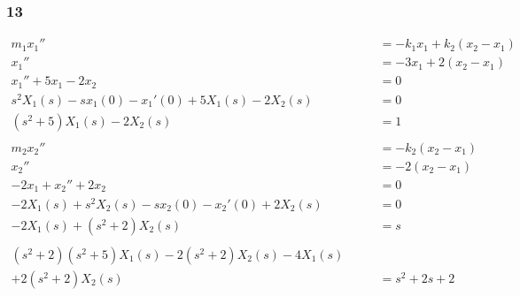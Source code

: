 \documentclass{article}
\begin{document}
\subsubsection{13}

\begin{align*}
  m_1 x_1''                                                         & = -k_1 x_1 + k_2 (x_2 - x_1)                                                          \\
  x_1''                                                             & = -3 x_1 + 2 (x_2 - x_1)                                                              \\
  x_1'' + 5 x_1 - 2 x_2                                             & = 0                                                                                   \\
  s^2 X_1(s) - s x_1(0) - x_1'(0) + 5 X_1(s) - 2 X_2(s)             & = 0                                                                                   \\
  (s^2 + 5) X_1(s) - 2 X_2(s)                                       & = 1                                                                                   \\ \\
  m_2 x_2''                                                         & = -k_2 (x_2 - x_1)                                                                    \\
  x_2''                                                             & = -2 (x_2 - x_1)                                                                      \\
  -2 x_1 + x_2'' + 2 x_2                                            & = 0                                                                                   \\
  -2 X_1(s) + s^2 X_2(s) - s x_2(0) - x_2'(0) + 2 X_2(s)            & = 0                                                                                   \\
  -2 X_1(s) + (s^2 + 2) X_2(s)                                      & = s                                                                                   \\ \\
  (s^2 + 2) (s^2 + 5) X_1(s) - 2 (s^2 + 2) X_2(s) - 4 X_1(s) \qquad &                                                                                       \\
  + 2 (s^2 + 2) X_2(s)                                              & = s^2 + 2 s + 2                                                                       \\

\end{align*}
\end{document}
